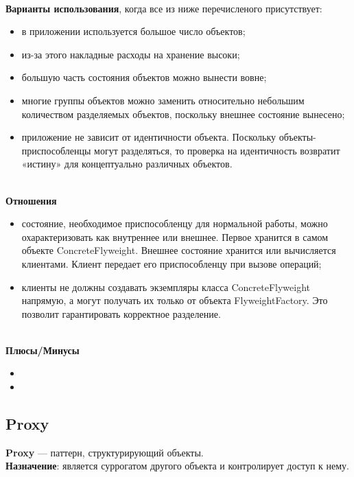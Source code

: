 \documentclass[a3paper,11pt]{report}
\begin{document}
\large\textbf{\\Варианты использования}, когда все из ниже перечисленого присутствует:
\begin{itemize}
\item в приложении используется большое число объектов;
\item из-за этого накладные расходы на хранение высоки;
\item большую часть состояния объектов можно вынести вовне;
\item многие группы объектов можно заменить относительно небольшим количеством разделяемых объектов, поскольку внешнее состояние вынесено;
\item приложение не зависит от идентичности объекта. Поскольку объекты-приспособленцы могут разделяться, то проверка на идентичность возвратит «истину» для концептуально различных объектов.
\end{itemize}

\textbf{\\Отношения}
\begin{itemize}
\item состояние, необходимое приспособленцу для нормальной работы, можно охарактеризовать как внутреннее или внешнее. Первое хранится в самом объекте ConcreteFlyweight. Внешнее состояние хранится или вычисляется клиентами. Клиент передает его приспособленцу при вызове операций;
\item клиенты не должны создавать экземпляры класса ConcreteFlyweight напрямую, а могут получать их только от объекта FlyweightFactory. Это позволит гарантировать корректное разделение.
\end{itemize}

\textbf{\\Плюсы/Минусы}
\begin{itemize}
\item []
\item []
\end{itemize}

\newpage
\subsection{Proxy}

\large\textbf{Proxy} --- паттерн, структурирующий объекты.
\\
\large\textbf{Назначение}: является суррогатом другого объекта и контролирует доступ к нему.
\\
\end{document}
